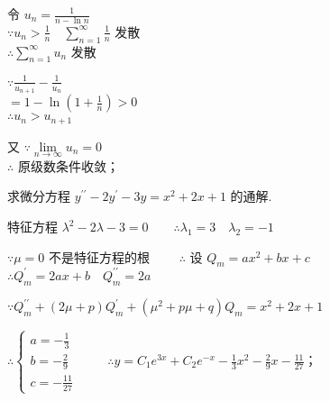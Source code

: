 \begin{solution}
\begin{calculations}[columns = 3, label = (\arabic*)]
        \item 令 $u_n =  \frac{1}{n - \ln{n}}$\\
        $\because u_n > \frac{1}{n} \quad \sum\limits_{n = 1}^{\infty} \frac{1}{n}$ 发散 \\
        $\therefore \sum\limits_{n = 1}^{\infty} u_n$ 发散

        $\because \frac{1}{u_{n + 1}} - \frac{1}{u_n}$\\
        $= 1 - \ln\left(1 + \frac{1}{n}\right) > 0$\\
        $\therefore u_n > u_{n + 1}$

        又 $\because \lim\limits_{n \to \infty} u_n = 0$ \\
        $\therefore$ 原级数条件收敛；
    \end{calculations}
\end{solution}

\begin{problem}[points = 7]
求微分方程 $y^{\prime\prime} - 2y^{\prime} - 3y = x^2 + 2x + 1$ 的通解.
\end{problem}
\begin{solution}
    特征方程 $\lambda^2 - 2\lambda - 3 = 0 \qquad \therefore \lambda_1 = 3 \quad \lambda_2 = -1$

    $\because \mu = 0$ 不是特征方程的根 $\qquad \therefore$ 设 $Q_m = ax^2 + bx + c \qquad$
    $\therefore Q_m^{\prime} = 2ax + b \quad Q_m^{\prime\prime} = 2a$

    $\because Q_m^{\prime\prime} + (2\mu + p)Q_m^{\prime} + (\mu^2 + p\mu + q)Q_m = x^2 + 2x + 1$

    $\therefore \begin{cases}
            a = -\frac{1}{3} \\
            b = -\frac{2}{9} \\
            c = -\frac{11}{27}
        \end{cases} \qquad$
    $\therefore y = C_1e^{3x} + C_2e^{-x} - \frac{1}{3}x^2 - \frac{2}{9}x - \frac{11}{27}$；
\end{solution}

